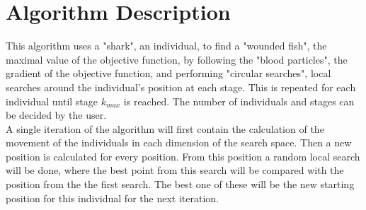 \documentclass[runningheads]{llncs}
\begin{document}
\section{Algorithm Description} \label{sec:description}
This algorithm uses a "shark", an individual, to find a "wounded fish", the maximal value of the objective function, by following the "blood particles", the gradient of the objective function, and performing "circular searches", local searches around the individual's position at each stage. This is repeated for each individual until stage $k_{max}$ is reached. The number of individuals and stages can be decided by the user. \\
A single iteration of the algorithm will first contain the calculation of the movement of the individuals in each dimension of the search space. Then a new position is calculated for every position. From this position a random local search will be done, where the best point from this search will be compared with the position from the the first search. The best one of these will be the new starting position for this individual for the next iteration.

\end{document}
